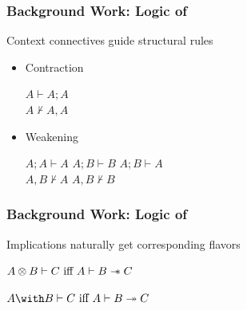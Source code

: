 \begin{frame}[c]
  \frametitle{Background Work: Logic of \BI{}}
  \begin{center}
  Context connectives guide structural rules

  \begin{itemize}
  \item Contraction
    \begin{center}
      $A \vdash A;A$\\
      $A \not\vdash A,A$
    \end{center}

  \item Weakening
    \begin{center}
      $A;A \vdash A$ \qquad $A;B \vdash B$ \qquad $A;B \vdash A$\\
      $A,B \not\vdash A$ \qquad $A,B \not\vdash B$
    \end{center}
  \end{itemize}
\end{center}
\end{frame}

\begin{frame}[c]
  \frametitle{Background Work: Logic of \BI{}}
  \begin{center}
    Implications naturally get corresponding flavors

    $A \otimes B \vdash C\ \text{iff}\ A \vdash B \mathrel{-\mkern-6mu*} C$

    $A \with B \vdash C\ \text{iff}\ A \vdash B \shimp C$
  \end{center}
\end{frame}


